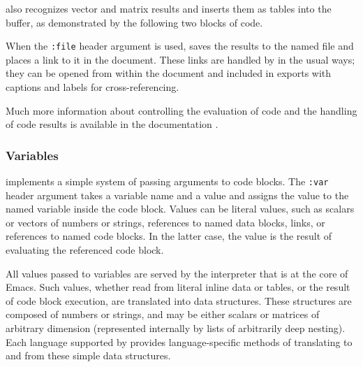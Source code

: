 \documentclass[article,shortnames]{jss}
\begin{document}
 also recognizes vector and matrix results and
inserts them as tables into the buffer, as demonstrated by the
following two blocks of  code.










When the \texttt{:file} header argument is used,  saves the results
to the named file and places a link to it in the document. These links
are handled by  in the usual ways; they can be opened from
within the document and included in exports with captions and labels
for cross-referencing.

Much more information about controlling the evaluation of code and the
handling of code results is available in the 
documentation \cite[Ch. 14]{dominik10:_org_mode_refer_manual}.
\subsubsection{Variables}
\label{sec-3-2-4}

 implements a simple system of passing arguments to code
blocks.  The \texttt{:var} header argument takes a variable name and a value
and assigns the value to the named variable inside the code block.
Values can be literal values, such as scalars or vectors of numbers or
strings, references to named data blocks, links, or references to
named code blocks.  In the latter case, the value is the result of
evaluating the referenced code block.

All values passed to variables are served by the 
interpreter that is at the core of Emacs.  Such values, whether read
from literal inline data or tables, or the result of code block
execution, are translated into  data structures.  These
structures are composed of numbers or strings, and may be either
scalars or matrices of arbitrary dimension (represented internally by
 lists of arbitrarily deep nesting).  Each language supported by
 provides language-specific methods of translating to and from
these simple  data structures.
\end{document}
